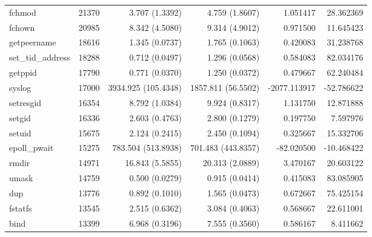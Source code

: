 \begin{longtable}{>{\ttfamily}lrrrrr}
                         fchmod &      21370 &           3.707 (1.3392) &           4.759 (1.8607) &        1.051417 &    28.362369 \\
                         fchown &      20985 &           8.342 (4.5080) &           9.314 (4.9012) &        0.971500 &    11.645423 \\
                    getpeername &      18616 &           1.345 (0.0737) &           1.765 (0.1063) &        0.420083 &    31.238768 \\
              set\_tid\_address &      18288 &           0.712 (0.0497) &           1.296 (0.0568) &        0.584083 &    82.034176 \\
                        getppid &      17790 &           0.771 (0.0370) &           1.250 (0.0372) &        0.479667 &    62.240484 \\
                         syslog &      17000 &      3934.925 (105.4348) &       1857.811 (56.5502) &    -2077.113917 &   -52.786622 \\
                      setresgid &      16354 &           8.792 (1.0384) &           9.924 (0.8317) &        1.131750 &    12.871888 \\
                         setgid &      16336 &           2.603 (0.4763) &           2.800 (0.1279) &        0.197750 &     7.597976 \\
                         setuid &      15675 &           2.124 (0.2415) &           2.450 (0.1094) &        0.325667 &    15.332706 \\
                   epoll\_pwait &      15275 &       783.504 (513.8938) &       701.483 (443.8357) &      -82.020500 &   -10.468422 \\
                          rmdir &      14971 &          16.843 (5.5855) &          20.313 (2.0889) &        3.470167 &    20.603122 \\
                          umask &      14759 &           0.500 (0.0279) &           0.915 (0.0414) &        0.415083 &    83.085905 \\
                            dup &      13776 &           0.892 (0.1010) &           1.565 (0.0473) &        0.672667 &    75.425154 \\
                        fstatfs &      13545 &           2.515 (0.6362) &           3.084 (0.4063) &        0.568667 &    22.611001 \\
                           bind &      13399 &           6.968 (0.3196) &           7.555 (0.3560) &        0.586167 &     8.411662 \\

\end{longtable}
